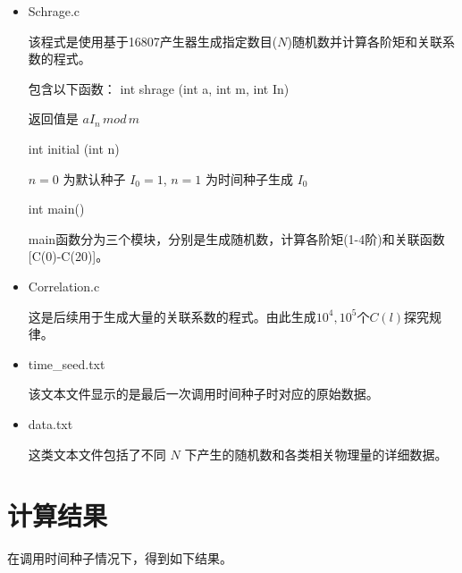 \documentclass[UTF8]{ctexart}
\begin{document}
	\begin{itemize}
		\item Schrage.c 
		
		该程式是使用基于16807产生器生成指定数目($N$)随机数并计算各阶矩和关联系数的程式。
		
		包含以下函数：
		\subitem int shrage (int a, int m, int In)
		
		返回值是 $aI_n\,mod\,m$
		
		\subitem int initial (int n)
		
		$n=0$ 为默认种子 $I_0=1$, $n=1$ 为时间种子生成 $I_0$
		
		\subitem int main()
		
		main函数分为三个模块，分别是生成随机数，计算各阶矩(1-4阶)和关联函数[C(0)-C(20)]。	
		
		\item Correlation.c 
		
		这是后续用于生成大量的关联系数的程式。由此生成$10^4,10^5$个$C(l)$探究规律。
		
		\item time\_seed.txt
		
		该文本文件显示的是最后一次调用时间种子时对应的原始数据。
		
		\item data.txt
		
		这类文本文件包括了不同 $N$ 下产生的随机数和各类相关物理量的详细数据。
		
		
	\end{itemize}
	
	\section{计算结果}
	在调用时间种子情况下，得到如下结果。
\end{document}
